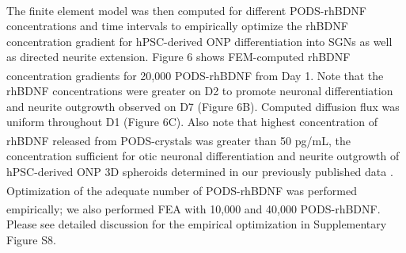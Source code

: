 \documentclass[review]{elsarticle}
\begin{document}
The finite element model was then computed for different PODS\textsuperscript{\textregistered}-rhBDNF concentrations and time intervals to empirically optimize the rhBDNF concentration gradient for hPSC-derived ONP differentiation into SGNs as well as directed neurite extension. Figure 6 shows FEM-computed rhBDNF concentration gradients for 20,000 PODS\textsuperscript{\textregistered}-rhBDNF from Day 1. Note that the rhBDNF concentrations were greater on D2 to promote neuronal differentiation and neurite outgrowth observed on D7 (Figure 6B). Computed diffusion flux was uniform throughout D1 (Figure 6C). Also note that highest concentration of rhBDNF released from PODS\textsuperscript{\textregistered}-crystals was greater than 50 pg/mL, the concentration sufficient for otic neuronal differentiation and neurite outgrowth of hPSC-derived ONP 3D spheroids determined in our previously published data \cite{Chang2020}. Optimization of the adequate number of PODS\textsuperscript{\textregistered}-rhBDNF was performed empirically; we also performed FEA with 10,000 and 40,000 PODS\textsuperscript{\textregistered}-rhBDNF. Please see detailed discussion for the empirical optimization in Supplementary Figure S8. 
\end{document}
